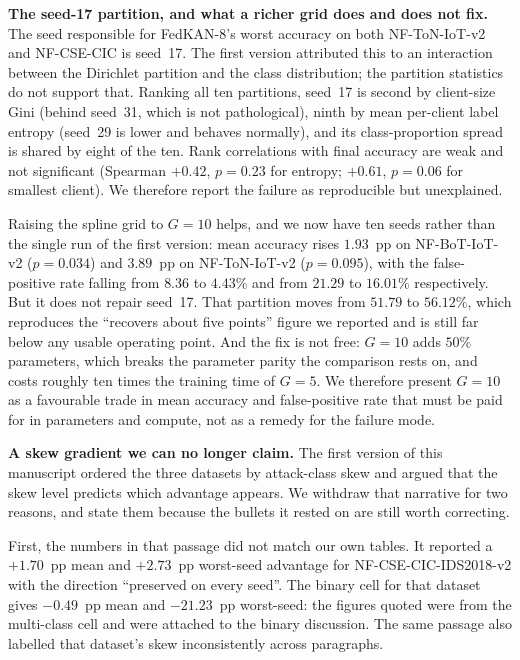 \textbf{The seed-17 partition, and what a richer grid does and does not fix.} The seed
responsible for FedKAN-8's worst accuracy on both NF-ToN-IoT-v2 and NF-CSE-CIC is seed~17.
The first version attributed this to an interaction between the Dirichlet partition and the
class distribution; the partition statistics do not support that. Ranking all ten partitions,
seed~17 is second by client-size Gini (behind seed~31, which is not pathological), ninth by
mean per-client label entropy (seed~29 is lower and behaves normally), and its
class-proportion spread is shared by eight of the ten. Rank correlations with final accuracy
are weak and not significant (Spearman $+0.42$, $p=0.23$ for entropy; $+0.61$, $p=0.06$ for
smallest client). We therefore report the failure as reproducible but unexplained.

Raising the spline grid to $G=10$ helps, and we now have ten seeds rather than the single run
of the first version: mean accuracy rises $1.93$~pp on NF-BoT-IoT-v2 ($p=0.034$) and
$3.89$~pp on NF-ToN-IoT-v2 ($p=0.095$), with the false-positive rate falling from $8.36$ to
$4.43\%$ and from $21.29$ to $16.01\%$ respectively. But it does not repair seed~17. That
partition moves from $51.79$ to $56.12\%$, which reproduces the ``recovers about five points''
figure we reported and is still far below any usable operating point. And the fix is not free:
$G=10$ adds $50\%$ parameters, which breaks the parameter parity the comparison rests on, and
costs roughly ten times the training time of $G=5$. We therefore present $G=10$ as a
favourable trade in mean accuracy and false-positive rate that must be paid for in parameters
and compute, not as a remedy for the failure mode.

\textbf{A skew gradient we can no longer claim.} The first version of this manuscript ordered
the three datasets by attack-class skew and argued that the skew level predicts which advantage
appears. We withdraw that narrative for two reasons, and state them because the bullets it rested
on are still worth correcting.

First, the numbers in that passage did not match our own tables. It reported a $+1.70$~pp mean
and $+2.73$~pp worst-seed advantage for NF-CSE-CIC-IDS2018-v2 with the direction ``preserved on
every seed''. The binary cell for that dataset gives $-0.49$~pp mean and $-21.23$~pp worst-seed:
the figures quoted were from the multi-class cell and were attached to the binary discussion. The
same passage also labelled that dataset's skew inconsistently across paragraphs.

